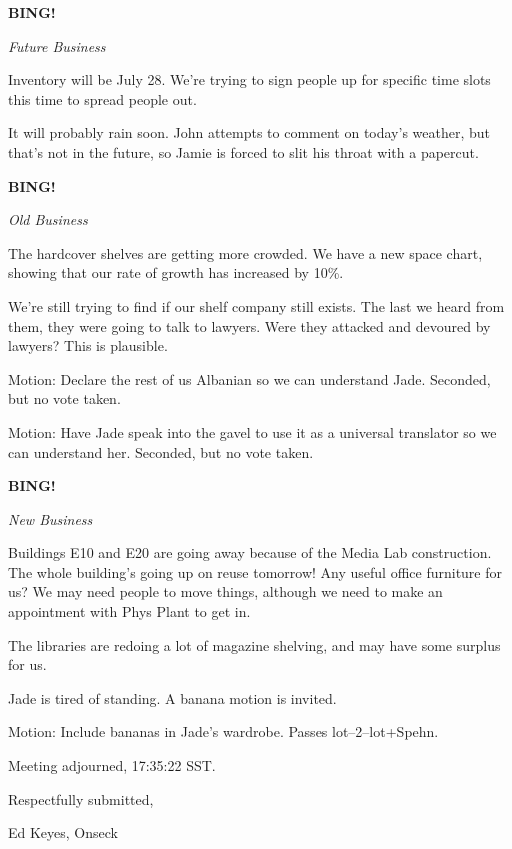 \documentclass[12pt]{article}
\newcommand{\bing}{{\bf BING!} }
\newcommand{\goto}[1]{\bing \vskip 12pt \centerline{{\em{#1}}}}
\begin{document}
\goto{Future Business}

Inventory will be July 28.  We're trying to sign people up for specific
time slots this time to spread people out.

It will probably rain soon.  John attempts to comment on today's
weather, but that's not in the future, so Jamie is forced to slit his
throat with a papercut.

\goto{Old Business}

The hardcover shelves are getting more crowded.  We have a new space
chart, showing that our rate of growth has increased by 10\%.

We're still trying to find if our shelf company still exists.  The last
we heard from them, they were going to talk to lawyers.  Were they
attacked and devoured by lawyers?  This is plausible.

Motion: Declare the rest of us Albanian so we can understand Jade.
Seconded, but no vote taken.

Motion: Have Jade speak into the gavel to use it as a universal
translator so we can understand her.  Seconded, but no vote taken.

\goto{New Business}

Buildings E10 and E20 are going away because of the Media Lab construction.
The whole building's going up on reuse tomorrow!  Any useful office
furniture for us?  We may need people to move things, although we need to
make an appointment with Phys Plant to get in.

The libraries are redoing a lot of magazine shelving, and may have some
surplus for us.

Jade is tired of standing.  A banana motion is invited.

Motion: Include bananas in Jade's wardrobe.  Passes lot--2--lot+Spehn.

\vspace{12pt}

\noindent
Meeting adjourned, 17:35:22 SST.

\vspace{18pt}

\centerline{Respectfully submitted,}
\centerline{Ed Keyes, Onseck}
\end{document}
